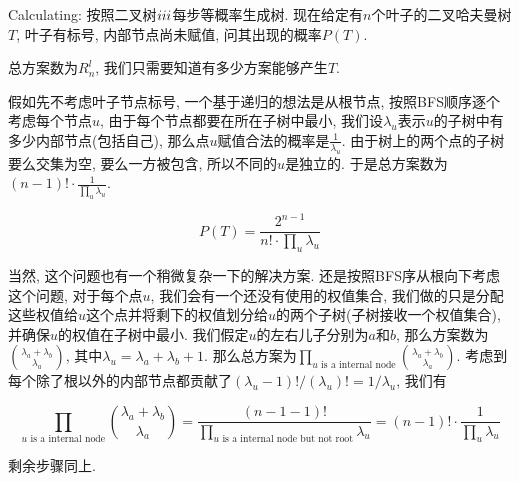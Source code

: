 	\begin{prob} [二叉树$\uppercase\expandafter{\romannumeral4}$]
		
		Calculating: 按照二叉树$\uppercase\expandafter{\romannumeral3}$每步等概率生成树. 现在给定有$n$个叶子的二叉哈夫曼树$T$, 叶子有标号, 内部节点尚未赋值, 问其出现的概率$P(T)$.
		
		\sol
		总方案数为$R_n^l$, 我们只需要知道有多少方案能够产生$T$.
		
		假如先不考虑叶子节点标号, 一个基于递归的想法是从根节点, 按照BFS顺序逐个考虑每个节点$u$, 由于每个节点都要在所在子树中最小, 我们设$\lambda_u$表示$u$的子树中有多少内部节点(包括自己), 那么点$u$赋值合法的概率是$\frac{1}{\lambda_u}$. 由于树上的两个点的子树要么交集为空, 要么一方被包含, 所以不同的$u$是独立的. 于是总方案数为$(n - 1)! \cdot \frac{1}{\prod\limits_{u}\lambda_u}$.
		
		\begin{equation*}
			P(T) = \dfrac{2^{n - 1}}{n! \cdot \prod\limits_{u} \lambda_u}
		\end{equation*}
		
		当然, 这个问题也有一个稍微复杂一下的解决方案. 还是按照BFS序从根向下考虑这个问题, 对于每个点$u$, 我们会有一个还没有使用的权值集合, 我们做的只是分配这些权值给$u$这个点并将剩下的权值划分给$u$的两个子树(子树接收一个权值集合), 并确保$u$的权值在子树中最小. 我们假定$u$的左右儿子分别为$a$和$b$, 那么方案数为$\binom{\lambda_a + \lambda_b}{\lambda_a}$, 其中$\lambda_u = \lambda_a + \lambda_b + 1$. 那么总方案为$\prod\limits_{u \text{ is a internal node}}\binom{\lambda_a + \lambda_b}{\lambda_a}$. 考虑到每个除了根以外的内部节点都贡献了$(\lambda_u-1)! / (\lambda_u)! = 1 / \lambda_u$, 我们有
		
		\begin{equation*}
			\prod\limits_{u \text{ is a internal node}}\binom{\lambda_a + \lambda_b}{\lambda_a} = \dfrac{(n - 1 - 1)!}{\prod\limits_{u \text{ is a internal node but not root}}\lambda_u} = (n - 1)! \cdot \frac{1}{\prod\limits_{u}\lambda_u}
		\end{equation*}
		
		剩余步骤同上.
		
	\end{prob}

